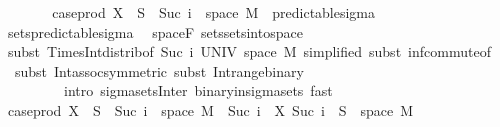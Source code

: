 \begin{isabellebody}
\ \ \ \ \isamarkupfalse%
\ \isamarkupfalse%
\ {\isachardoublequoteopen}case{\isacharunderscore}{\kern0pt}prod\ X\ {\isacharminus}{\kern0pt}{\isacharbackquote}{\kern0pt}\ S\ {\isasyminter}\ {\isacharparenleft}{\kern0pt}{\isacharbraceleft}{\kern0pt}Suc\ i{\isacharbraceright}{\kern0pt}\ {\isasymtimes}\ space\ M{\isacharparenright}{\kern0pt}\ {\isasymin}\ predictable{\isacharunderscore}{\kern0pt}sigma{\isachardoublequoteclose}\ \isamarkupfalse%
\ sets{\isacharunderscore}{\kern0pt}predictable{\isacharunderscore}{\kern0pt}sigma\ \isamarkupfalse%
\ space{\isacharunderscore}{\kern0pt}F\ sets{\isachardot}{\kern0pt}sets{\isacharunderscore}{\kern0pt}into{\isacharunderscore}{\kern0pt}space\isanewline
\ \ \ \ \ \ \isamarkupfalse%
\ {\isacharparenleft}{\kern0pt}subst\ Times{\isacharunderscore}{\kern0pt}Int{\isacharunderscore}{\kern0pt}distrib{}{\isacharbrackleft}{\kern0pt}of\ {\isachardoublequoteopen}{\isacharbraceleft}{\kern0pt}Suc\ i{\isacharbraceright}{\kern0pt}{\isachardoublequoteclose}\ UNIV\ {\isachardoublequoteopen}space\ M{\isachardoublequoteclose}{\isacharcomma}{\kern0pt}\ simplified{\isacharbrackright}{\kern0pt}{\isacharcomma}{\kern0pt}\ subst\ inf{\isachardot}{\kern0pt}commute{\isacharbrackleft}{\kern0pt}of\ {\isachardoublequoteopen}{\isacharunderscore}{\kern0pt}\ {\isasymtimes}\ {\isacharunderscore}{\kern0pt}{\isachardoublequoteclose}{\isacharbrackright}{\kern0pt}{\isacharcomma}{\kern0pt}\ subst\ Int{\isacharunderscore}{\kern0pt}assoc{\isacharbrackleft}{\kern0pt}symmetric{\isacharbrackright}{\kern0pt}{\isacharcomma}{\kern0pt}\ subst\ Int{\isacharunderscore}{\kern0pt}range{\isacharunderscore}{\kern0pt}binary{\isacharparenright}{\kern0pt}\ \isanewline
\ \ \ \ \ \ \ \ \ {\isacharparenleft}{\kern0pt}intro\ sigma{\isacharunderscore}{\kern0pt}sets{\isacharunderscore}{\kern0pt}Inter\ binary{\isacharunderscore}{\kern0pt}in{\isacharunderscore}{\kern0pt}sigma{\isacharunderscore}{\kern0pt}sets{\isacharcomma}{\kern0pt}\ fast{\isacharparenright}{\kern0pt}{\isacharplus}{\kern0pt}\isanewline
\ \ \ \ \isamarkupfalse%
\ \isamarkupfalse%
\ {\isachardoublequoteopen}case{\isacharunderscore}{\kern0pt}prod\ X\ {\isacharminus}{\kern0pt}{\isacharbackquote}{\kern0pt}\ S\ {\isasyminter}\ {\isacharparenleft}{\kern0pt}{\isacharbraceleft}{\kern0pt}Suc\ i{\isacharbraceright}{\kern0pt}\ {\isasymtimes}\ space\ M{\isacharparenright}{\kern0pt}\ {\isacharequal}{\kern0pt}\ {\isacharbraceleft}{\kern0pt}Suc\ i{\isacharbraceright}{\kern0pt}\ {\isasymtimes}\ {\isacharparenleft}{\kern0pt}X\ {\isacharparenleft}{\kern0pt}Suc\ i{\isacharparenright}{\kern0pt}\ {\isacharminus}{\kern0pt}{\isacharbackquote}{\kern0pt}\ S\ {\isasyminter}\ space\ M{\isacharparenright}{\kern0pt}{\isachardoublequoteclose}\ \isamarkupfalse%

\end{isabellebody}
